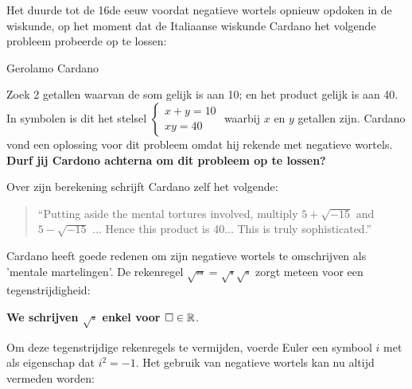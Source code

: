 \documentclass{ximera}
\begin{document}
Het duurde tot de 16de eeuw voordat negatieve wortels opnieuw opdoken in de wiskunde, op het moment dat de Italiaanse wiskunde Cardano het volgende probleem probeerde op te lossen: 




\begin{exercise}{Gerolamo Cardano}

    Zoek 2 getallen waarvan de som gelijk is aan 10; en het product gelijk is aan 40.
    In symbolen is dit het stelsel \( 
        \begin{cases}
            x + y = 10 \\
            xy = 40
        \end{cases} \)
    waarbij \(x\) en \(y\) getallen zijn. \newline
    Cardano vond een oplossing voor dit probleem omdat hij rekende met negatieve wortels. \newline
    \textbf{Durf jij Cardono achterna om dit probleem op te lossen?}
\end{exercise}


Over zijn berekening schrijft Cardano zelf het volgende: 

\begin{quote}
    “Putting aside the mental tortures involved, 
    multiply \(5 + \sqrt{-15}\) and \(5 - \sqrt{-15}\) ... 
    Hence this product is 40... 
    This is truly sophisticated.”
\end{quote}




\begin{remark}
    Cardano heeft goede redenen om zijn negatieve wortels te omschrijven als 'mentale martelingen'.
    De rekenregel \(\sqrt{\square \square} = \sqrt{\square}\sqrt{\square}\) zorgt meteen voor een tegenstrijdigheid: 
    \begin{center} 
        \textbf{We schrijven \(\sqrt{\square}\) enkel voor \( \square \in \mathbb{R} \)}. 
    \end{center}
\end{remark}


Om deze tegenstrijdige rekenregels te vermijden, voerde Euler een symbool \(i\) met als eigenschap dat \textbf{\(i^2 = -1\)}.
Het gebruik van negatieve wortels kan nu altijd vermeden worden: 
\end{document}
